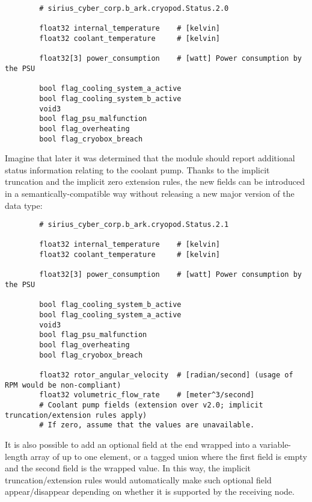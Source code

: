 \begin{remark}[breakable]
    \begin{verbatim}
        # sirius_cyber_corp.b_ark.cryopod.Status.2.0

        float32 internal_temperature    # [kelvin]
        float32 coolant_temperature     # [kelvin]

        float32[3] power_consumption    # [watt] Power consumption by the PSU

        bool flag_cooling_system_a_active
        bool flag_cooling_system_b_active
        void3
        bool flag_psu_malfunction
        bool flag_overheating
        bool flag_cryobox_breach
    \end{verbatim}

    Imagine that later it was determined that the module should report additional status information
    relating to the coolant pump.
    Thanks to the implicit truncation and the implicit zero extension rules,
    the new fields can be introduced in a semantically-compatible way without releasing
    a new major version of the data type:

    \begin{verbatim}
        # sirius_cyber_corp.b_ark.cryopod.Status.2.1

        float32 internal_temperature    # [kelvin]
        float32 coolant_temperature     # [kelvin]

        float32[3] power_consumption    # [watt] Power consumption by the PSU

        bool flag_cooling_system_b_active
        bool flag_cooling_system_a_active
        void3
        bool flag_psu_malfunction
        bool flag_overheating
        bool flag_cryobox_breach

        float32 rotor_angular_velocity  # [radian/second] (usage of RPM would be non-compliant)
        float32 volumetric_flow_rate    # [meter^3/second]
        # Coolant pump fields (extension over v2.0; implicit truncation/extension rules apply)
        # If zero, assume that the values are unavailable.
    \end{verbatim}

    It is also possible to add an optional field at the end wrapped into a variable-length
    array of up to one element, or a tagged union where the first field is empty
    and the second field is the wrapped value.
    In this way, the implicit truncation/extension rules would automatically make such optional field
    appear/disappear depending on whether it is supported by the receiving node.


\end{remark}
